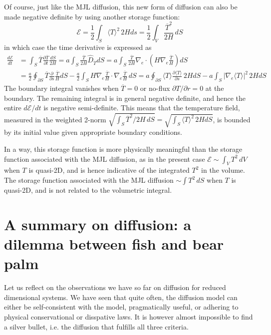 Of course, just like the MJL diffusion, this new form of diffusion can also be made negative definite by using another storage function:
\[
    \mathcal{E} = \frac{1}{2}\int_S \langle T \rangle^2 \, 2Hds = \frac{1}{2}\int_V \frac{\overline{T}^2}{2H} \, dS
\]
in which case the time derivative is expressed as
\[\begin{aligned}
    \frac{d \mathcal{E}}{dt} &= \int_S \overline{T} \frac{\partial \overline{T}}{\partial t} \frac{dS}{2H} = a\int_S \frac{\overline{T}}{2H} \hat{D}_{\overline{T}} dS = a\int_S \frac{\overline{T}}{2H} \nabla_e \cdot \left(H \nabla_e \frac{\overline{T}}{H}\right) dS \\ 
    &= \frac{a}{2} \oint_{\partial S} \overline{T} \frac{\partial}{\partial s} \frac{\overline{T}}{H} dS - \frac{a}{2} \int_S H \nabla_e \frac{\overline{T}}{H}\cdot \nabla_e \frac{\overline{T}}{H} \, dS 
    = a \oint_{\partial S} \langle T \rangle \frac{\partial \langle T \rangle}{\partial s} \, 2H dS - a \int_S |\nabla_e \langle T \rangle|^2 \, 2H dS 
\end{aligned}
\]
The boundary integral vanishes when $\overline{T} = 0$ or no-flux $\partial T/\partial r = 0$ at the boundary. The remaining integral is in general negative definite, and hence the entire $d\mathcal{E}/dt$ is negative semi-definite.
This means that the temperature field, measured in the weighted 2-norm $\sqrt{\int_S \overline{T}^2/2H \, dS} = \sqrt{\int_S \langle T \rangle^2 \, 2H dS}$, is bounded by its initial value given appropriate boundary conditions.

In a way, this storage function is more physically meaningful than the storage function associated with the MJL diffusion, as in the present case $\mathcal{E} \sim \int_V T^2 \, dV$ when $T$ is quasi-2D, and is hence indicative of the integrated $T^2$ in the volume. The storage function associated with the MJL diffusion $\sim \int T^2 \, dS$ when $T$ is quasi-2D, and is not related to the volumetric integral.


\section{A summary on diffusion: a dilemma between fish and bear palm}

Let us reflect on the observations we have so far on diffusion for reduced dimensional systems. We have seen that quite often, the diffusion model can either be self-consistent with the model, pragmatically useful, or adhering to physical conservational or disspative laws. It is however almost impossible to find a silver bullet, i.e. the diffusion that fulfills all three criteria. 

